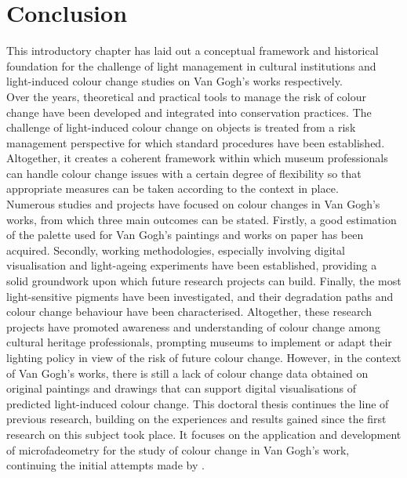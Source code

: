 \newpage
\section{Conclusion}

This introductory chapter has laid out a conceptual framework and historical foundation for the challenge of light management in cultural institutions and light-induced colour change studies on Van Gogh’s works respectively. \\ 

Over the years, theoretical and practical tools to manage the risk of colour change have been developed and integrated into conservation practices. The challenge of light-induced colour change on objects is treated from a risk management perspective for which standard procedures have been established. Altogether, it creates a coherent framework within which museum professionals can handle colour change issues with a certain degree of flexibility so that appropriate measures can be taken according to the context in place. \\

Numerous studies and projects have focused on colour changes in Van Gogh's works, from which three main outcomes can be stated. Firstly, a good estimation of the palette used for Van Gogh’s paintings and works on paper has been acquired. Secondly, working methodologies, especially involving digital visualisation and light-ageing experiments have been established, providing a solid groundwork upon which future research projects can build. Finally, the most light-sensitive pigments have been investigated, and their degradation paths and colour change behaviour have been characterised. Altogether, these research projects have promoted awareness and understanding of colour change among cultural heritage professionals, prompting museums to implement or adapt their lighting policy in view of the risk of future colour change. However, in the context of Van Gogh’s works, there is still a lack of colour change data obtained on original paintings and drawings that can support digital visualisations of predicted light-induced colour change. This doctoral thesis continues the line of previous research, building on the experiences and results gained since the first research on this subject took place. It focuses on the application and development of microfadeometry for the study of colour change in Van Gogh's work, continuing the initial attempts made by \citet{fieberg_paintings_2017}. \\
